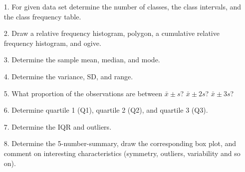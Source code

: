 \documentclass[letterpaper,12pt]{article}
\begin{document}
\begin{enumerate}
\begin{enumerate}
      \item[1.]
        For given data set determine the number of classes, the class intervals, and the class frequency table.
      \item[2.]
        Draw a relative frequency histogram, polygon, a cumulative relative frequency histogram, and ogive.
      \item[3.]
        Determine the sample mean, median, and mode.
      \item[4.]
        Determine the variance, SD, and range.
      \item[5.]
        What proportion of the observations are between $\bar{x} \pm s$? $\bar{x} \pm 2s$? $\bar{x} \pm 3s$?
      \item[6.]
        Determine quartile 1 (Q1), quartile 2 (Q2), and quartile 3 (Q3).
      \item[7.]
        Determine the IQR and outliers.
      \item[8.]
        Determine the 5-number-summary, draw the corresponding box plot, and comment on interesting characteristics (symmetry, outliers, variability and so on).
    \end{enumerate}
\end{enumerate}
\end{document}
